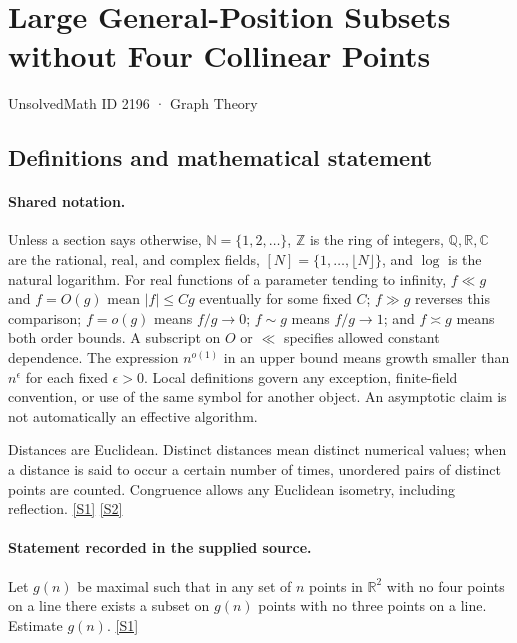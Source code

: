 \documentclass[11pt,a4paper]{article}
\newcommand{\N}{\mathbb{N}}
\newcommand{\Z}{\mathbb{Z}}
\newcommand{\Q}{\mathbb{Q}}
\newcommand{\R}{\mathbb{R}}
\newcommand{\C}{\mathbb{C}}
\newcommand{\sref}[2]{\hyperlink{source:#1:#2}{[S#2]}}
\begin{document}

\setcounter{section}{2195}

\section{Large General-Position Subsets without Four Collinear Points}\label{2196}

{\small\sffamily UnsolvedMath ID 2196 · Graph Theory}

\subsection{Definitions and mathematical statement}

\paragraph{Shared notation.}Unless a section says otherwise, $\N=\{1,2,\ldots\}$,
$\Z$ is the ring of integers, $\Q,\R,\C$ are the rational, real, and complex
fields, $[N]=\{1,\ldots,\lfloor N\rfloor\}$, and $\log$ is the natural
logarithm. For real functions of a parameter tending to infinity,
$f\ll g$ and $f=O(g)$ mean $|f|\leq Cg$ eventually for some fixed $C$;
$f\gg g$ reverses this comparison; $f=o(g)$ means $f/g\to0$;
$f\sim g$ means $f/g\to1$; and $f\asymp g$ means both order bounds.
A subscript on $O$ or $\ll$ specifies allowed constant dependence.
The expression $n^{o(1)}$ in an upper bound means growth smaller than
$n^\epsilon$ for each fixed $\epsilon>0$. Local definitions govern any
exception, finite-field convention, or use of the same symbol for another
object. An asymptotic claim is not automatically an effective algorithm.



Distances are Euclidean. Distinct distances mean distinct numerical values; when a distance is said to occur a certain number of times, unordered pairs of distinct points are counted. Congruence allows any Euclidean isometry, including reflection. \sref{2196}{1} \sref{2196}{2}

\paragraph{Statement recorded in the supplied source.}
Let $g(n)$ be maximal such that in any set of $n$ points in $\mathbb{R}^2$ with no four points on a line there exists a subset on $g(n)$ points with no three points on a line. Estimate $g(n)$. \sref{2196}{1}
\end{document}
